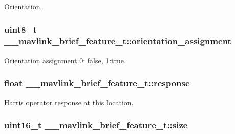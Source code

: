 Orientation. 

\hypertarget{struct____mavlink__brief__feature__t_acac2124a4903d5985747b5b2a05560ae}{
\subsubsection[{orientation\+\_\+assignment}]{\setlength{\rightskip}{0pt plus 5cm}uint8\+\_\+t \+\_\+\+\_\+mavlink\+\_\+brief\+\_\+feature\+\_\+t\+::orientation\+\_\+assignment}}\label{struct____mavlink__brief__feature__t_acac2124a4903d5985747b5b2a05560ae}


Orientation assignment 0\+: false, 1\+:true. 

\hypertarget{struct____mavlink__brief__feature__t_adbd04463451af98733eff275a30c2869}{
\subsubsection[{response}]{\setlength{\rightskip}{0pt plus 5cm}float \+\_\+\+\_\+mavlink\+\_\+brief\+\_\+feature\+\_\+t\+::response}}\label{struct____mavlink__brief__feature__t_adbd04463451af98733eff275a30c2869}


Harris operator response at this location. 

\hypertarget{struct____mavlink__brief__feature__t_ae5a40ae07cd595f22abed40eefa24be1}{
\subsubsection[{size}]{\setlength{\rightskip}{0pt plus 5cm}uint16\+\_\+t \+\_\+\+\_\+mavlink\+\_\+brief\+\_\+feature\+\_\+t\+::size}}\label{struct____mavlink__brief__feature__t_ae5a40ae07cd595f22abed40eefa24be1}


